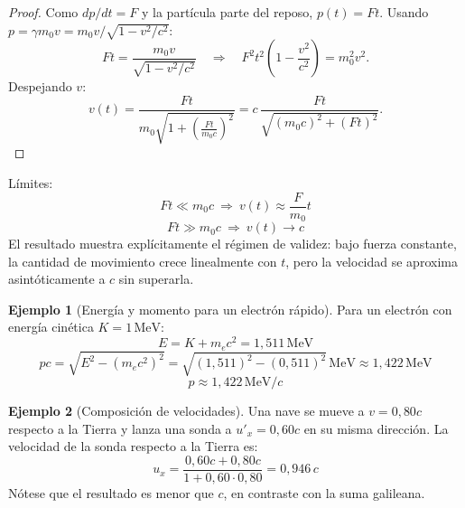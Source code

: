 \documentclass[12pt, a4paper]{article}
\theoremstyle{plain}
\theoremstyle{definition}
\newtheorem{ejemplo}{Ejemplo}[section]
\theoremstyle{remark}
\begin{document}
\begin{proof}
Como $dp/dt=F$ y la partícula parte del reposo, $p(t)=Ft$. Usando
$p=\gamma m_0v=m_0v/\sqrt{1-v^2/c^2}$:
\begin{equation}
  Ft=\frac{m_0v}{\sqrt{1-v^2/c^2}}
  \quad\Rightarrow\quad
  F^2t^2\!\left(1-\frac{v^2}{c^2}\right)=m_0^2v^2.
\end{equation}
Despejando $v$:
\begin{equation}
  v(t)=\frac{Ft}{m_0\sqrt{1+\left(\frac{Ft}{m_0c}\right)^2}}
      =c\,\frac{Ft}{\sqrt{(m_0c)^2+(Ft)^2}}.
\end{equation}
\end{proof}
Límites:
\begin{equation}
  Ft\ll m_0c \ \Rightarrow\ v(t)\approx \frac{F}{m_0}t
\end{equation}
\begin{equation}
  Ft\gg m_0c \ \Rightarrow\ v(t)\to c
\end{equation}
El resultado muestra explícitamente el régimen de validez: bajo fuerza constante, la
cantidad de movimiento crece linealmente con $t$, pero la velocidad se aproxima
asintóticamente a $c$ sin superarla.
\begin{ejemplo}[Energía y momento para un electrón rápido]
Para un electrón con energía cinética $K=1\,\mathrm{MeV}$:
\begin{equation}
  E=K+m_ec^2=1{,}511\,\mathrm{MeV}
\end{equation}
\begin{equation}
  pc = \sqrt{E^2-(m_ec^2)^2}
      = \sqrt{(1{,}511)^2-(0{,}511)^2}\,\mathrm{MeV}
      \approx 1{,}422\,\mathrm{MeV}
\end{equation}
\begin{equation}
  p \approx 1{,}422\,\mathrm{MeV}/c
\end{equation}
\end{ejemplo}

\begin{ejemplo}[Composición de velocidades]
Una nave se mueve a $v=0{,}80c$ respecto a la Tierra y lanza una sonda a
$u'_x=0{,}60c$ en su misma dirección. La velocidad de la sonda respecto a la Tierra es:
\begin{equation}
  u_x=\frac{0{,}60c+0{,}80c}{1+0{,}60\cdot0{,}80}=0{,}946\,c
\end{equation}
Nótese que el resultado es menor que $c$, en contraste con la suma galileana.
\end{ejemplo}
\end{document}
